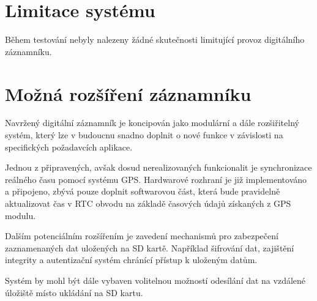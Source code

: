 
\section{Limitace systému}
\label{limitace}
Během testování nebyly nalezeny žádné skutečnosti limitující provoz digitálního záznamníku.



\section{Možná rozšíření záznamníku}
\label{mozne_rozsireni}
Navržený digitální záznamník je koncipován jako modulární a dále rozšiřitelný systém, který lze v budoucnu snadno doplnit o nové funkce v závislosti na specifických požadavcích aplikace.

Jednou z připravených, avšak dosud nerealizovaných funkcionalit je synchronizace reálného času pomocí systému GPS. Hardwarové rozhraní je již implementováno a připojeno, zbývá pouze doplnit softwarovou část, která bude pravidelně aktualizovat čas v RTC obvodu na základě časových údajů získaných z GPS modulu.

Dalším potenciálním rozšířením je zavedení mechanismů pro zabezpečení zaznamenaných dat uložených na SD kartě. Například šifrování dat, zajištění integrity a autentizační systém chránící přístup k uloženým datům.

Systém by mohl být dále vybaven volitelnou možností odesílání dat na vzdálené úložiště místo ukládání na SD kartu.



